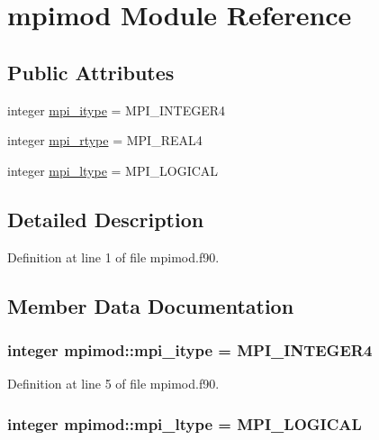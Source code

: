\hypertarget{classmpimod}{
\section{mpimod \-Module \-Reference}
\label{classmpimod}
}
\subsection*{\-Public \-Attributes}
\begin{DoxyCompactItemize}
\item 
integer \hyperlink{classmpimod_af62a8ae2d736a3459fb4b53b10e387b7}{mpi\-\_\-itype} = \-M\-P\-I\-\_\-\-I\-N\-T\-E\-G\-E\-R4
\item 
integer \hyperlink{classmpimod_a5a2316efc68e8c325c7f02c3e5038e9e}{mpi\-\_\-rtype} = \-M\-P\-I\-\_\-\-R\-E\-A\-L4
\item 
integer \hyperlink{classmpimod_a71f9e9a581e32ba32ab9064f41bb1f91}{mpi\-\_\-ltype} = \-M\-P\-I\-\_\-\-L\-O\-G\-I\-C\-A\-L
\end{DoxyCompactItemize}


\subsection{\-Detailed \-Description}


\-Definition at line 1 of file mpimod.\-f90.



\subsection{\-Member \-Data \-Documentation}
\hypertarget{classmpimod_af62a8ae2d736a3459fb4b53b10e387b7}{
\subsubsection[{mpi\-\_\-itype}]{\setlength{\rightskip}{0pt plus 5cm}integer {\bf mpimod\-::mpi\-\_\-itype} = \-M\-P\-I\-\_\-\-I\-N\-T\-E\-G\-E\-R4}}
\label{classmpimod_af62a8ae2d736a3459fb4b53b10e387b7}


\-Definition at line 5 of file mpimod.\-f90.

\hypertarget{classmpimod_a71f9e9a581e32ba32ab9064f41bb1f91}{
\subsubsection[{mpi\-\_\-ltype}]{\setlength{\rightskip}{0pt plus 5cm}integer {\bf mpimod\-::mpi\-\_\-ltype} = \-M\-P\-I\-\_\-\-L\-O\-G\-I\-C\-A\-L}}
\label{classmpimod_a71f9e9a581e32ba32ab9064f41bb1f91}


